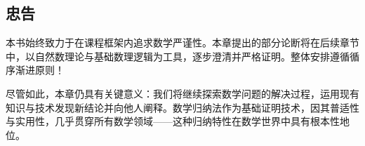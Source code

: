 \subsection{忠告}

本书始终致力于在课程框架内追求数学严谨性。本章提出的部分论断将在后续章节中，以自然数理论与基础数理逻辑为工具，逐步澄清并严格证明。整体安排遵循循序渐进原则！

尽管如此，本章仍具有关键意义：我们将继续探索数学问题的解决过程，运用现有知识与技术发现新结论并向他人阐释。数学归纳法作为基础证明技术，因其普适性与实用性，几乎贯穿所有数学领域——这种归纳特性在数学世界中具有根本性地位。